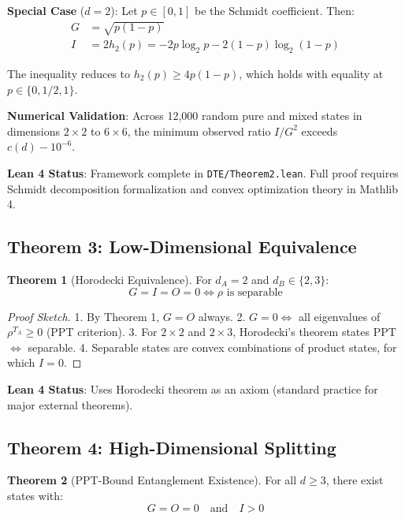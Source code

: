 \documentclass[11pt,a4paper]{article}
\theoremstyle{definition}
\newtheorem{theorem}{Theorem}[section]
\begin{document}
\textbf{Special Case} ($d=2$): Let $p \in [0,1]$ be the Schmidt coefficient. Then:
\begin{align}
    G &= \sqrt{p(1-p)} \\
    I &= 2h_2(p) = -2p\log_2 p - 2(1-p)\log_2(1-p)
\end{align}

The inequality reduces to $h_2(p) \geq 4p(1-p)$, which holds with equality at $p \in \{0, 1/2, 1\}$.

\textbf{Numerical Validation}: Across 12,000 random pure and mixed states in dimensions $2 \times 2$ to $6 \times 6$, the minimum observed ratio $I/G^2$ exceeds $c(d) - 10^{-6}$.

\textbf{Lean 4 Status}: Framework complete in \texttt{DTE/Theorem2.lean}. Full proof requires Schmidt decomposition formalization and convex optimization theory in Mathlib 4.

\subsection{Theorem 3: Low-Dimensional Equivalence}

\begin{theorem}[Horodecki Equivalence]
For $d_A = 2$ and $d_B \in \{2, 3\}$:
\begin{equation}
    G = I = O = 0 \iff \rho \text{ is separable}
\end{equation}
\end{theorem}

\begin{proof}[Proof Sketch]
1. By Theorem 1, $G = O$ always.
2. $G = 0 \iff$ all eigenvalues of $\rho^{T_A} \geq 0$ (PPT criterion).
3. For $2 \times 2$ and $2 \times 3$, Horodecki's theorem states PPT $\iff$ separable.
4. Separable states are convex combinations of product states, for which $I = 0$.
\end{proof}

\textbf{Lean 4 Status}: Uses Horodecki theorem as an axiom (standard practice for major external theorems).

\subsection{Theorem 4: High-Dimensional Splitting}

\begin{theorem}[PPT-Bound Entanglement Existence]
For all $d \geq 3$, there exist states with:
\begin{equation}
    G = O = 0 \quad \text{and} \quad I > 0
\end{equation}
\end{theorem}
\end{document}
